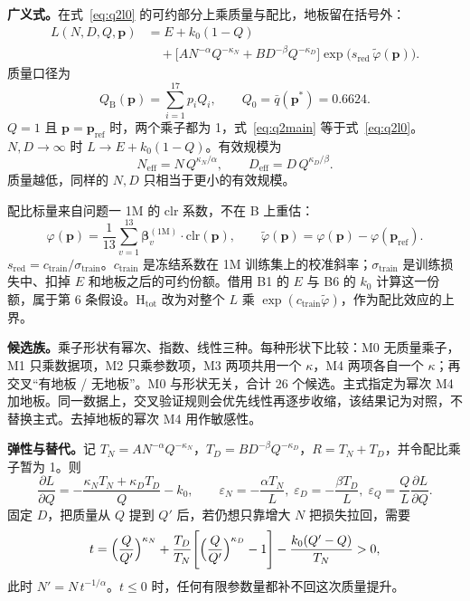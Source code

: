 \textbf{广义式。}在式~\eqref{eq:q2l0} 的可约部分上乘质量与配比，地板留在括号外：
\begin{equation}
\begin{aligned}
L(N,D,Q,\mathbf{p})
&=E+k_0(1-Q)\\
&\quad+\bigl[AN^{-\alpha}Q^{-\kappa_N}+BD^{-\beta}Q^{-\kappa_D}\bigr]
\exp\bigl(s_{\mathrm{red}}\,\tilde\varphi(\mathbf{p})\bigr).
\end{aligned}
\label{eq:q2main}
\end{equation}
质量口径为
\begin{equation}
Q_{\mathrm B}(\mathbf{p})=\sum_{i=1}^{17}p_i Q_i,\qquad Q_0=\bar q(\mathbf{p}^*)=0.6624.
\label{eq:qmix}
\end{equation}
$Q=1$ 且 $\mathbf{p}=\mathbf{p}_{\mathrm{ref}}$ 时，两个乘子都为 1，式~\eqref{eq:q2main} 等于式~\eqref{eq:q2l0}。$N,D\to\infty$ 时 $L\to E+k_0(1-Q)$。有效规模为
\begin{equation}
N_{\mathrm{eff}}=N\,Q^{\kappa_N/\alpha},\qquad
D_{\mathrm{eff}}=D\,Q^{\kappa_D/\beta}.
\label{eq:q2neff}
\end{equation}
质量越低，同样的 $N,D$ 只相当于更小的有效规模。

配比标量来自问题一 1M 的 clr 系数，不在 B 上重估：
\begin{equation}
\varphi(\mathbf{p})=\frac1{13}\sum_{v=1}^{13}\boldsymbol\beta_v^{(1\mathrm M)}\cdot\mathrm{clr}(\mathbf{p}),\qquad
\tilde\varphi(\mathbf{p})=\varphi(\mathbf{p})-\varphi(\mathbf{p}_{\mathrm{ref}}).
\label{eq:q2phi}
\end{equation}
$s_{\mathrm{red}}=c_{\mathrm{train}}/\sigma_{\mathrm{train}}$。$c_{\mathrm{train}}$ 是冻结系数在 1M 训练集上的校准斜率；$\sigma_{\mathrm{train}}$ 是训练损失中、扣掉 $E$ 和地板之后的可约份额。借用 B1 的 $E$ 与 B6 的 $k_0$ 计算这一份额，属于第 6 条假设。H$_{\mathrm{tot}}$ 改为对整个 $L$ 乘 $\exp(c_{\mathrm{train}}\tilde\varphi)$，作为配比效应的上界。

\textbf{候选族。}乘子形状有幂次、指数、线性三种。每种形状下比较：M0 无质量乘子，M1 只乘数据项，M2 只乘参数项，M3 两项共用一个 $\kappa$，M4 两项各自一个 $\kappa$；再交叉“有地板 / 无地板”。M0 与形状无关，合计 26 个候选。主式指定为幂次 M4 加地板。同一数据上，交叉验证规则会优先线性再逐步收缩，该结果记为对照，不替换主式。去掉地板的幂次 M4 用作敏感性。

\textbf{弹性与替代。}记 $T_N=AN^{-\alpha}Q^{-\kappa_N}$，$T_D=BD^{-\beta}Q^{-\kappa_D}$，$R=T_N+T_D$，并令配比乘子暂为 1。则
\begin{equation}
\frac{\partial L}{\partial Q}=-\frac{\kappa_N T_N+\kappa_D T_D}{Q}-k_0,\qquad
\varepsilon_N=-\frac{\alpha T_N}{L},\;
\varepsilon_D=-\frac{\beta T_D}{L},\;
\varepsilon_Q=\frac{Q}{L}\frac{\partial L}{\partial Q}.
\label{eq:q2elas}
\end{equation}
固定 $D$，把质量从 $Q$ 提到 $Q'$ 后，若仍想只靠增大 $N$ 把损失拉回，需要
\begin{equation}
t=\Bigl(\frac{Q}{Q'}\Bigr)^{\kappa_N}
+\frac{T_D}{T_N}\Biggl[\Bigl(\frac{Q}{Q'}\Bigr)^{\kappa_D}-1\Biggr]
-\frac{k_0(Q'-Q)}{T_N}>0,
\label{eq:q2t}
\end{equation}
此时 $N'=N\,t^{-1/\alpha}$。$t\le 0$ 时，任何有限参数量都补不回这次质量提升。

